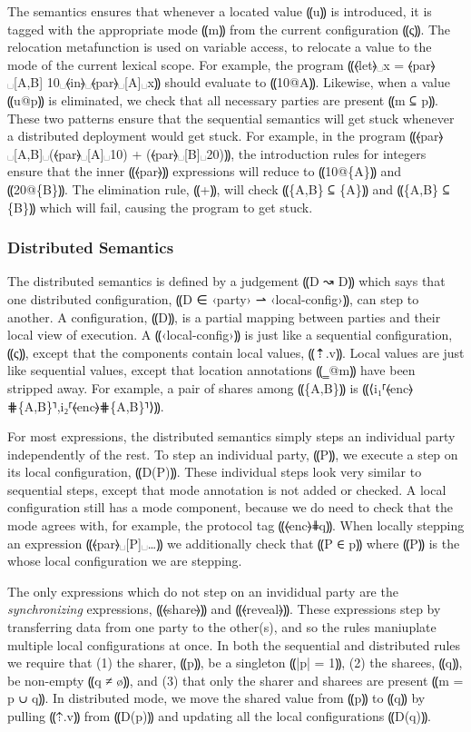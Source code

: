 The semantics ensures that whenever a located value ⸨u⸩ is introduced, it is tagged with
the appropriate mode ⸨m⸩ from the current configuration ⸨ς⸩. The relocation metafunction
is used on variable access, to relocate a value to the mode of the current lexical scope.
For example, the program ⸨⦑let⦒␣x = ⦑par⦒␣[A,B] 10␣⦑in⦒␣⦑par⦒␣[A]␣x⸩ should evaluate to
⸨10@{A}⸩. Likewise, when a value ⸨u@p⸩ is eliminated, we check that all necessary parties
are present ⸨m ⊆ p⸩. These two patterns ensure that the sequential semantics will get stuck
whenever a distributed deployment would get stuck. For example, in the program
⸨⦑par⦒␣[A,B]␣(⦑par⦒␣[A]␣10) + (⦑par⦒␣[B]␣20)⸩, the introduction rules for integers ensure that
the inner ⸨⦑par⦒⸩ expressions will reduce to ⸨10@\{A\}⸩ and ⸨20@\{B\}⸩. The elimination rule, ⸨+⸩,
will check ⸨\{A,B\} ⊆ \{A\}⸩ and ⸨\{A,B\} ⊆ \{B\}⸩ which will fail, causing the program to get stuck.

\subsubsection{Distributed Semantics}

The distributed semantics is defined by a judgement ⸨D ↝ D⸩ which says that
one distributed configuration, ⸨D ∈ ‹party› ⇀ ‹local-config›⸩, can step to another.
A configuration, ⸨D⸩, is a partial mapping between parties and their local
view of execution. A ⸨‹local-config›⸩ is just like a sequential configuration, ⸨ς⸩,
except that the components contain local values, ⸨⇡.v⸩. Local values are just like
sequential values, except that location annotations ⸨‗@m⸩ have been stripped away.
For example, a pair of shares among ⸨\{A,B\}⸩ is ⸨⟨i₁⸢⦑enc⦒⋕\{A,B\}⸣,i₂⸢⦑enc⦒⋕\{A,B\}⸣⟩⸩.

For most expressions, the distributed semantics simply steps an individual party independently of
the rest. To step an individual party, ⸨P⸩, we execute a step on its local configuration, ⸨D(P)⸩.
These individual steps look very similar to sequential steps, except that mode annotation is not added
or checked. A local configuration still has a mode component, because we do need to check that the mode
agrees with, for example, the protocol tag ⸨⦑enc⦒⋕q⸩. When locally stepping an expression ⸨⦑par⦒␣[P]␣…⸩
we additionally check that ⸨P ∈ p⸩ where ⸨P⸩ is the whose local configuration we are stepping.

The only expressions which do not step on an
invididual party are the \emph{synchronizing} expressions, ⸨⦑share⦒⸩ and ⸨⦑reveal⦒⸩. These expressions
step by transferring data from one party to the other(s), and so the rules maniuplate multiple local
configurations at once. In both the sequential and distributed rules we require that (1) the sharer,
⸨p⸩, be a singleton ⸨|p| = 1⸩, (2) the sharees, ⸨q⸩, be non-empty ⸨q ≠ ø⸩, and (3) that only the
sharer and sharees are present ⸨m = p ∪ q⸩. In distributed mode, we move the shared value from ⸨p⸩
to ⸨q⸩ by pulling ⸨⇡.v⸩ from ⸨D(p)⸩ and updating all the local configurations ⸨D(q)⸩.

